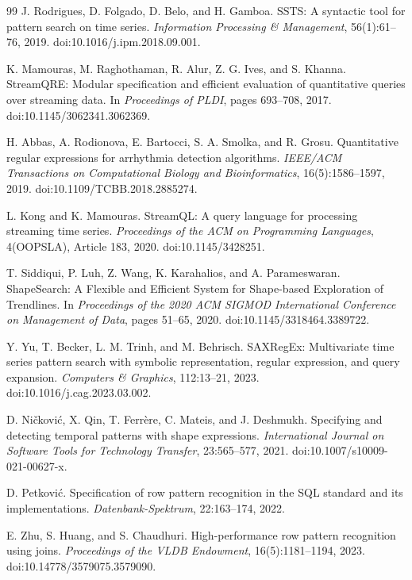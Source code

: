 \documentclass[11pt,a4paper]{article}
\begin{document}
\begin{thebibliography}{99}
J. Rodrigues, D. Folgado, D. Belo, and H. Gamboa.
\newblock SSTS: A syntactic tool for pattern search on time series.
\newblock \emph{Information Processing \& Management}, 56(1):61--76, 2019. doi:10.1016/j.ipm.2018.09.001.

K. Mamouras, M. Raghothaman, R. Alur, Z. G. Ives, and S. Khanna.
\newblock StreamQRE: Modular specification and efficient evaluation of quantitative queries over streaming data.
\newblock In \emph{Proceedings of PLDI}, pages 693--708, 2017. doi:10.1145/3062341.3062369.

H. Abbas, A. Rodionova, E. Bartocci, S. A. Smolka, and R. Grosu.
\newblock Quantitative regular expressions for arrhythmia detection algorithms.
\newblock \emph{IEEE/ACM Transactions on Computational Biology and Bioinformatics}, 16(5):1586--1597, 2019. doi:10.1109/TCBB.2018.2885274.

L. Kong and K. Mamouras.
\newblock StreamQL: A query language for processing streaming time series.
\newblock \emph{Proceedings of the ACM on Programming Languages}, 4(OOPSLA), Article 183, 2020. doi:10.1145/3428251.

T. Siddiqui, P. Luh, Z. Wang, K. Karahalios, and A. Parameswaran.
\newblock ShapeSearch: A Flexible and Efficient System for Shape-based Exploration of Trendlines.
\newblock In \emph{Proceedings of the 2020 ACM SIGMOD International Conference on Management of Data}, pages 51--65, 2020. doi:10.1145/3318464.3389722.

Y. Yu, T. Becker, L. M. Trinh, and M. Behrisch.
\newblock SAXRegEx: Multivariate time series pattern search with symbolic representation, regular expression, and query expansion.
\newblock \emph{Computers \& Graphics}, 112:13--21, 2023. doi:10.1016/j.cag.2023.03.002.

D. Ni\v{c}kovi\'c, X. Qin, T. Ferr\`ere, C. Mateis, and J. Deshmukh.
\newblock Specifying and detecting temporal patterns with shape expressions.
\newblock \emph{International Journal on Software Tools for Technology Transfer}, 23:565--577, 2021. doi:10.1007/s10009-021-00627-x.

D. Petkovi\'c.
\newblock Specification of row pattern recognition in the SQL standard and its implementations.
\newblock \emph{Datenbank-Spektrum}, 22:163--174, 2022.

E. Zhu, S. Huang, and S. Chaudhuri.
\newblock High-performance row pattern recognition using joins.
\newblock \emph{Proceedings of the VLDB Endowment}, 16(5):1181--1194, 2023. doi:10.14778/3579075.3579090.


\end{thebibliography}
\end{document}
